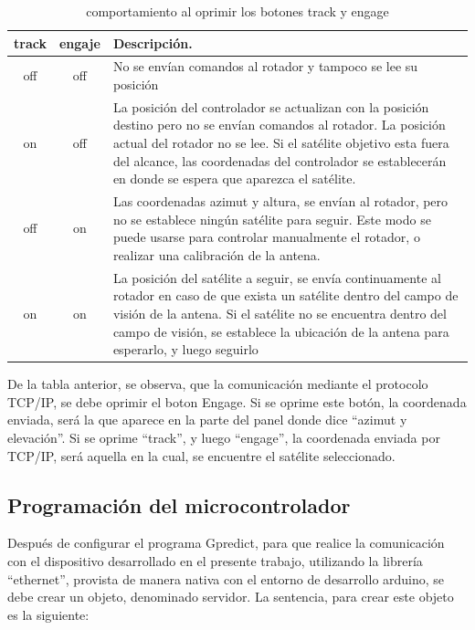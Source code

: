 \begin{table}[h!]
	\begin{tabular}{|c|c|p{11.0cm}|}
		\hline 
		track & engaje & Descripción. \\
		\hline 
		off & off  & No se envían comandos al rotador y tampoco se lee su posición \\ 
		\hline 
		on  & off  &   La posición del controlador se actualizan con la posición destino pero no se envían comandos al rotador. La posición actual del rotador no se lee. Si el satélite objetivo esta fuera del alcance, las coordenadas del controlador se establecerán en donde se espera que aparezca el satélite. \\
		\hline 
		off & on  &   Las coordenadas azimut y altura, se envían al rotador, pero no se establece ningún satélite para seguir.  Este modo se puede usarse para controlar manualmente el rotador, o realizar una calibración de la antena. \\  
		\hline 
		on  & on   &La posición del satélite a seguir, se envía continuamente al rotador en caso de que exista un satélite dentro del campo de visión de la antena. Si el satélite no se encuentra dentro del campo de visión, se establece la ubicación de la antena para esperarlo, y luego seguirlo \\
		\hline 
				
	\end{tabular}
	\caption{comportamiento al oprimir los botones track y engage}
\end{table}

De la tabla anterior, se observa, que la comunicación mediante el protocolo TCP/IP, se debe oprimir el boton Engage. Si se oprime este botón, la coordenada enviada, será la que aparece en la parte del panel donde dice ``azimut y elevación''. Si se oprime ``track'', y luego ``engage'', la coordenada enviada por TCP/IP, será aquella en la cual, se encuentre el satélite seleccionado. 

\vspace{-2mm}
\subsection{Programación del microcontrolador} 

Después de configurar el programa Gpredict, para que realice la comunicación con el dispositivo desarrollado en el presente trabajo, utilizando la librería ``ethernet'', provista de manera nativa con el entorno de desarrollo arduino, se debe crear un objeto, denominado servidor. La sentencia, para crear este objeto es la siguiente: 

